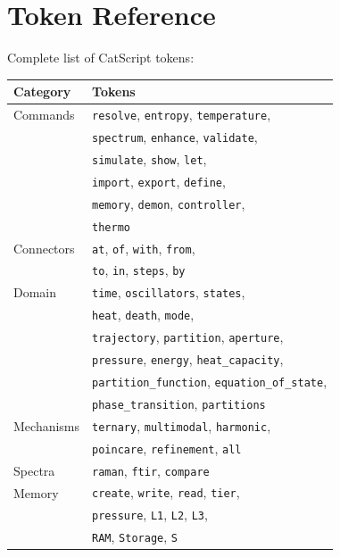 \documentclass[twocolumn,10pt]{article}
\begin{document}
\section{Token Reference}

Complete list of CatScript tokens:

\begin{table}[H]
\centering
\small
\begin{tabular}{@{}ll@{}}
\toprule
Category & Tokens \\
\midrule
Commands & \texttt{resolve}, \texttt{entropy}, \texttt{temperature}, \\
         & \texttt{spectrum}, \texttt{enhance}, \texttt{validate}, \\
         & \texttt{simulate}, \texttt{show}, \texttt{let}, \\
         & \texttt{import}, \texttt{export}, \texttt{define}, \\
         & \texttt{memory}, \texttt{demon}, \texttt{controller}, \\
         & \texttt{thermo} \\
\midrule
Connectors & \texttt{at}, \texttt{of}, \texttt{with}, \texttt{from}, \\
           & \texttt{to}, \texttt{in}, \texttt{steps}, \texttt{by} \\
\midrule
Domain & \texttt{time}, \texttt{oscillators}, \texttt{states}, \\
       & \texttt{heat}, \texttt{death}, \texttt{mode}, \\
       & \texttt{trajectory}, \texttt{partition}, \texttt{aperture}, \\
       & \texttt{pressure}, \texttt{energy}, \texttt{heat\_capacity}, \\
       & \texttt{partition\_function}, \texttt{equation\_of\_state}, \\
       & \texttt{phase\_transition}, \texttt{partitions} \\
\midrule
Mechanisms & \texttt{ternary}, \texttt{multimodal}, \texttt{harmonic}, \\
           & \texttt{poincare}, \texttt{refinement}, \texttt{all} \\
\midrule
Spectra & \texttt{raman}, \texttt{ftir}, \texttt{compare} \\
\midrule
Memory & \texttt{create}, \texttt{write}, \texttt{read}, \texttt{tier}, \\
       & \texttt{pressure}, \texttt{L1}, \texttt{L2}, \texttt{L3}, \\
       & \texttt{RAM}, \texttt{Storage}, \texttt{S} \\

\end{tabular}
\end{table}
\end{document}
